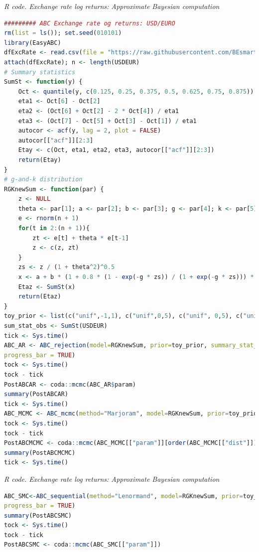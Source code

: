 \begin{tcolorbox}[enhanced,width=4.67in,center upper,
	fontupper=\large\bfseries,drop shadow southwest,sharp corners]
	\textit{R code. Exchange rate log returns: Approximate Bayesian computation}
	\begin{VF}
		\begin{lstlisting}[language=R]
######### ABC Exchange rate og returns: USD/EURO
rm(list = ls()); set.seed(010101)
library(EasyABC)
dfExcRate <- read.csv(file = "https://raw.githubusercontent.com/BEsmarter-consultancy/BSTApp/refs/heads/master/DataApp/ExchangeRate.csv", sep = ",", header = T)
attach(dfExcRate); n <- length(USDEUR)
# Summary statistics
SumSt <- function(y) {
	Oct <- quantile(y, c(0.125, 0.25, 0.375, 0.5, 0.625, 0.75, 0.875))
	eta1 <- Oct[6] - Oct[2]
	eta2 <- (Oct[6] + Oct[2] - 2 * Oct[4]) / eta1
	eta3 <- (Oct[7] - Oct[5] + Oct[3] - Oct[1]) / eta1
	autocor <- acf(y, lag = 2, plot = FALSE)
	autocor[["acf"]][2:3]
	Etay <- c(Oct, eta1, eta2, eta3, autocor[["acf"]][2:3])
	return(Etay)
}
# g-and-k distribution
RGKnewSum <- function(par) {
	z <- NULL
	theta <- par[1]; a <- par[2]; b <- par[3]; g <- par[4]; k <- par[5]
	e <- rnorm(n + 1)
	for(t in 2:(n + 1)){
		zt <- e[t] + theta * e[t-1]
		z <- c(z, zt)
	}
	zs <- z / (1 + theta^2)^0.5
	x <- a + b * (1 + 0.8 * (1 - exp(-g * zs)) / (1 + exp(-g * zs))) * (1 + zs^2)^k * zs
	Etaz <- SumSt(x)
	return(Etaz)
}
toy_prior <- list(c("unif",-1,1), c("unif",0,5), c("unif", 0,5), c("unif", -5,5), c("unif", -0.5,5))
sum_stat_obs <- SumSt(USDEUR)
tick <- Sys.time()
ABC_AR <- ABC_rejection(model=RGKnewSum, prior=toy_prior, summary_stat_target = sum_stat_obs, nb_simul=150000, tol = 0.0067,
progress_bar = TRUE)
tock <- Sys.time()
tock - tick
PostABCAR <- coda::mcmc(ABC_AR$param)
summary(PostABCAR)
tick <- Sys.time()
ABC_MCMC <- ABC_mcmc(method="Marjoram", model=RGKnewSum, prior=toy_prior, summary_stat_target=sum_stat_obs, n_rec = 100000, progress_bar = TRUE)
tock <- Sys.time()
tock - tick
PostABCMCMC <- coda::mcmc(ABC_MCMC[["param"]][order(ABC_MCMC[["dist"]])[1:1000],])
summary(PostABCMCMC)
tick <- Sys.time()
\end{lstlisting}
	\end{VF}
\end{tcolorbox}

\begin{tcolorbox}[enhanced,width=4.67in,center upper,
	fontupper=\large\bfseries,drop shadow southwest,sharp corners]
	\textit{R code. Exchange rate log returns: Approximate Bayesian computation}
	\begin{VF}
		\begin{lstlisting}[language=R]
ABC_SMC<-ABC_sequential(method="Lenormand", model=RGKnewSum, prior=toy_prior, summary_stat_target=sum_stat_obs, nb_simul = 30000, alpha = 0.034, p_acc_min = 0.05,
progress_bar = TRUE)
summary(PostABCSMC)
tock <- Sys.time()
tock - tick
PostABCSMC <- coda::mcmc(ABC_SMC[["param"]])
		\end{lstlisting}
	\end{VF}
\end{tcolorbox}

